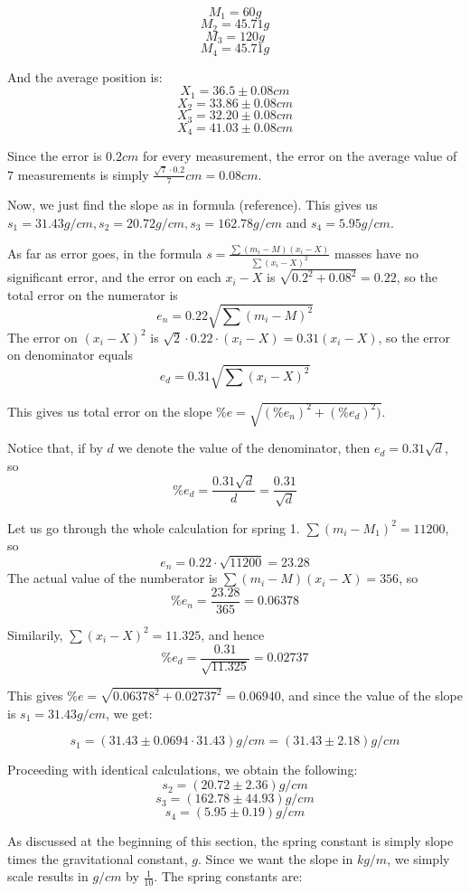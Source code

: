 \documentclass[main.tex]{subfiles}
\begin{document}
$$M_1 = 60g $$
$$M_2 = 45.71g$$
$$M_3 = 120g$$
$$M_4 = 45.71g$$

And the average position is:
$$X_1 = 36.5 \pm 0.08 cm$$
$$X_2 = 33.86 \pm 0.08 cm$$
$$X_3 = 32.20 \pm 0.08 cm$$
$$X_4 = 41.03 \pm 0.08 cm$$

Since the error is $0.2cm$ for every measurement, the error on the average value of $7$ measurements is simply $\frac{\sqrt{7} \cdot 0.2}{7}cm = 0.08cm $. 

Now, we just find the slope as in formula (reference). This gives us $ s_1 = 31.43g/cm, s_2 = 20.72g/cm, s_3 = 162.78g/cm$ and $s_4 = 5.95g/cm$.

As far as error goes, in the formula $s = \frac{\sum (m_i-M)(x_i-X)}{\sum (x_i-X)^2} $ masses have no significant error, and the error on each $x_i-X$ is $\sqrt{0.2^2 + 0.08^2} = 0.22 $, so the total error on the numerator is  $$e_n = 0.22 \sqrt{\sum(m_i-M)^2}$$ The error on $ (x_i-X)^2$ is $\sqrt{2} \cdot 0.22 \cdot (x_i-X) = 0.31(x_i-X)$, so the error on denominator equals $$e_d = 0.31 \sqrt{\sum(x_i-X)^2}$$

This gives us total error on the slope $ \%e = \sqrt{(\%e_n)^2 + (\%e_d)^2)} $. 

Notice that, if by $d$ we denote the value of the denominator, then $e_d = 0.31 \sqrt{d} $, so 
$$ \%e_d = \frac{0.31 \sqrt{d}}{d} = \frac{0.31}{\sqrt{d}} $$

Let us go through the whole calculation for spring 1. $\sum(m_i-M_1)^2 = 11200$, so $$ e_n = 0.22 \cdot \sqrt{11200} = 23.28 $$ The actual value of the numberator is $ \sum (m_i-M)(x_i-X) = 356 $, so $$ \%e_n = \frac{23.28}{365} = 0.06378 $$

Similarily, $ \sum(x_i-X)^2 = 11.325$, and hence
$$ \%e_d = \frac{0.31}{\sqrt{11.325}} = 0.02737 $$

This gives $ \%e = \sqrt{0.06378^2 + 0.02737^2} = 0.06940 $, and since the value of the slope is $s_1 = 31.43g/cm$, we get:

$$ s_1 = (31.43 \pm 0.0694 \cdot 31.43) g/cm = (31.43 \pm 2.18) g/cm $$

Proceeding with identical calculations, we obtain the following:
$$ s_2 = (20.72 \pm 2.36) g/cm $$
$$ s_3 = (162.78 \pm 44.93) g/cm $$
$$ s_4 = (5.95 \pm 0.19) g/cm $$

As discussed at the beginning of this section, the spring constant is simply slope times the gravitational constant, $g$. Since we want the slope in $kg/m$, we simply scale results in $g/cm$ by $\frac{1}{10} $. The spring constants are:
\end{document}
